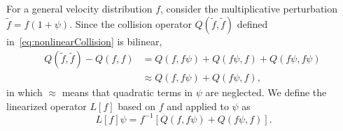 \documentclass[times,final,nopreprintline]{elsarticle}
\begin{document}
For a general velocity distribution $f$, consider the multiplicative perturbation $\tilde f = f(1+\psi)$. Since the collision operator $Q(\tilde f,\tilde f)$ defined in~\eqref{eq:nonlinearCollision} is bilinear, 
\begin{align}
    Q(\tilde f,\tilde f)  - Q(f,f)  &=  Q(f, f\psi) + Q(f\psi,f) + Q(f\psi,f\psi) \nonumber
    \\
   &\approx Q(f, f\psi) + Q(f\psi,f), \nonumber
\end{align}
in which $\approx$ means that quadratic terms in $\psi$ are neglected.
We  define the linearized operator $L[f]$ based on $f$ and applied to $\psi$ as
\begin{equation}~\label{eq:linearQ}
L[f]  \psi =  f^{-1} [ Q(f, f\psi) + Q(f\psi,f)].
\end{equation}
\end{document}
